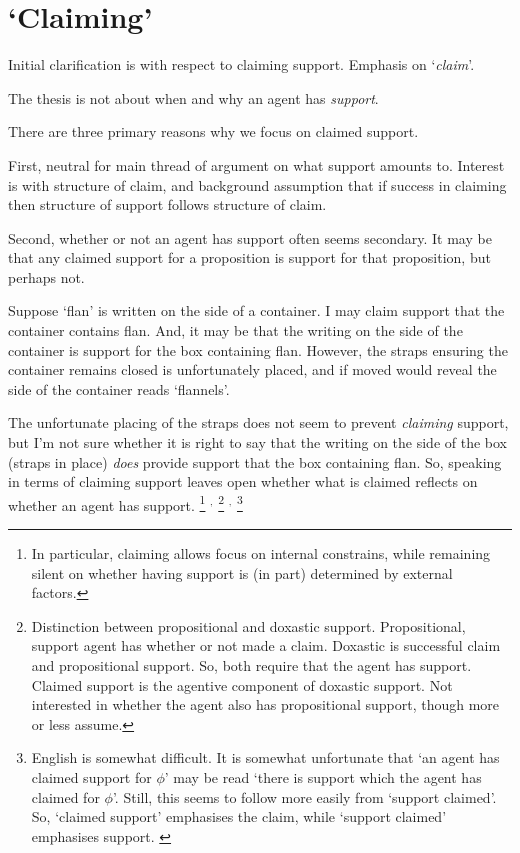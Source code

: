 \section{`Claiming'}
\label{sec:claiming}

\begin{note}
  Initial clarification is with respect to claiming support.
  Emphasis on `\emph{claim}'.

  The thesis is not about when and why an agent has \emph{support}.

  There are three primary reasons why we focus on claimed support.

  First, neutral for main thread of argument on what support amounts to.
  Interest is with structure of claim, and background assumption that if success in claiming then structure of support follows structure of claim.

  Second, whether or not an agent has support often seems secondary.
  It may be that any claimed support for a proposition is support for that proposition, but perhaps not.
  \begin{illustration}
    \label{illu:flan-nels}
    Suppose `flan' is written on the side of a container.
    I may claim support that the container contains flan.
    And, it may be that the writing on the side of the container is support for the box containing flan.
    However, the straps ensuring the container remains closed is unfortunately placed, and if moved would reveal the side of the container reads `flannels'.
  \end{illustration}

  The unfortunate placing of the straps does not seem to prevent \emph{claiming} support, but I'm not sure whether it is right to say that the writing on the side of the box (straps in place) \emph{does} provide support that the box containing flan.
  So, speaking in terms of claiming support leaves open whether what is claimed reflects on whether an agent has support.\nolinebreak
  \footnote{
    In particular, claiming allows focus on internal constrains, while remaining silent on whether having support is (in part) determined by external factors.
  }
  \(^{,}\)\nolinebreak
  \footnote{
    Distinction between propositional and doxastic support.
    Propositional, support agent has whether or not made a claim.
    Doxastic is successful claim and propositional support.
    So, both require that the agent has support.
    Claimed support is the agentive component of doxastic support.
    Not interested in whether the agent also has propositional support, though more or less assume.
  }
  \(^{,}\)\nolinebreak
  \footnote{
    {
      \color{red}
      English is somewhat difficult.
      It is somewhat unfortunate that `an agent has claimed support for \(\phi\)' may be read `there is support which the agent has claimed for \(\phi\)'.
      Still, this seems to follow more easily from `support claimed'.
      So, `claimed support' emphasises the claim, while `support claimed' emphasises support.
    }
  }


\end{note}
